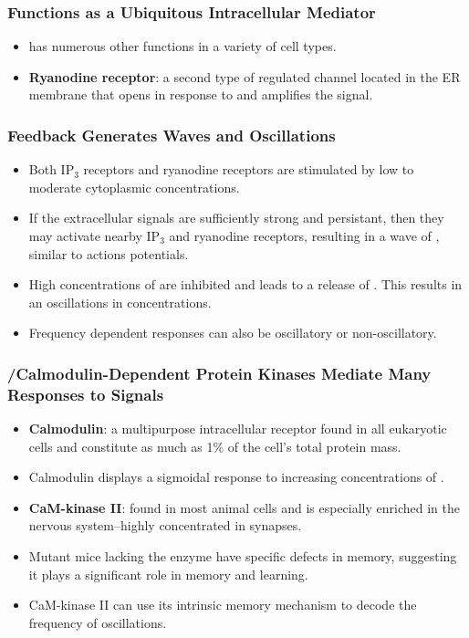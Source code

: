 \documentclass[12pt,a4paper]{article}
\begin{document}
\subsubsection{\texorpdfstring{}- Functions as a Ubiquitous Intracellular Mediator}
\begin{itemize}
    \item {} has numerous other functions in a variety of cell types.
    \item \textbf{Ryanodine receptor}: a second type of regulated  channel located in the ER membrane that opens in response to  and amplifies the  signal.
\end{itemize}

\subsubsection{Feedback Generates \texorpdfstring{}- Waves and Oscillations}
\begin{itemize}
    \item Both IP$_3$ receptors and ryanodine receptors are stimulated by low to moderate cytoplasmic  concentrations.
    \item If the extracellular signals are sufficiently strong and persistant, then they may activate nearby IP$_3$ and ryanodine receptors, resulting in a wave of , similar to actions potentials.
    \item High concentrations of  are inhibited and leads to a release of . This results in an oscillations in  concentrations.
    \item Frequency dependent responses can also be oscillatory or non-oscillatory.
\end{itemize}

\subsubsection{\texorpdfstring{}-/Calmodulin-Dependent Protein Kinases Mediate Many Responses to \texorpdfstring{}- Signals}
\begin{itemize}
    \item \textbf{Calmodulin}: a multipurpose intracellular  receptor found in all eukaryotic cells and constitute as much as 1\% of the cell's total protein mass.
    \item Calmodulin displays a sigmoidal response to increasing concentrations of .
    \item \textbf{CaM-kinase II}: found in most animal cells and is especially enriched in the nervous system--highly concentrated in synapses.
    \item Mutant mice lacking the enzyme have specific defects in memory, suggesting it plays a significant role in memory and learning.
    \item CaM-kinase II can use its intrinsic memory mechanism to decode the frequency of  oscillations.
\end{itemize}
\end{document}
